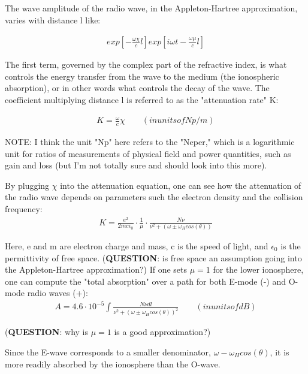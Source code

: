     The wave amplitude of the radio wave, in the Appleton-Hartree
    approximation, varies with distance l like: 

    \begin{gather}
      exp\left[ -\frac{\omega\chi}{c}l\right] exp\left[
      i\omega t - \frac{\omega\mu}{c}l\right]
    \end{gather}

    The first term, governed by the complex part of the refractive index,
    is what controls the energy transfer from the wave to the medium
    (the ionospheric absorption), or in other words what controls the
    decay of the wave. The coefficient multiplying distance l is
    referred to as the "attenuation rate" K:

    \begin{gather}
      K=\frac{\omega}{c}\chi \quad\quad(in units of Np/m)
    \end{gather}

    NOTE: I think the unit "Np" here refers to the "Neper," which is a
    logarithmic unit for ratios of measurements of physical field and power
    quantities, such as gain and loss (but I'm not totally sure and should
    look into this more). 

    By plugging $\chi$ into the attenuation equation, one can see how the 
    attenuation of the radio wave depends on parameters such the electron density 
    and the collision frequency:
    \begin{gather}
      K=\frac{e^{2}}{2mc\epsilon_{0}}\cdot\frac{1}{\mu}\cdot\frac{N\nu}
      {\nu^{2}+(\omega\pm\omega_{H}cos(\theta))} 
    \end{gather}
    
    Here, e and m are electron charge and mass, c is the speed of light,
    and $\epsilon_{0}$ is the permittivity of free space.
    (\textbf{QUESTION}: is
    free space an assumption going into the Appleton-Hartree
    approximation?) If one sets $\mu=1$ for the lower ionosphere, one can compute the
    "total absorption" over a path for both E-mode (-) and O-mode radio
    waves (+):
    \begin{gather}
      A=4.6\cdot10^{-5}\int\frac{N\nu
      dl}{\nu^{2}+(\omega\pm\omega_{H}cos(\theta))^{2}} 
      \quad\quad (in units of dB)
    \end{gather}

    (\textbf{QUESTION}: why is $\mu=1$ is a good approximation?)
    
    Since the E-wave corresponds to a smaller denominator,
    $\omega-\omega_{H}cos(\theta)$, it is more readily absorbed by the
    ionosphere than the O-wave.
    
